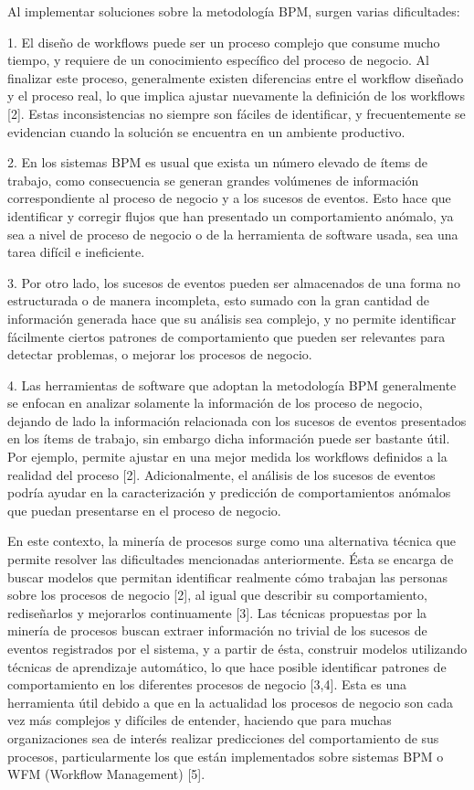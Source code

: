Al implementar soluciones sobre la metodología BPM, surgen varias dificultades:

1. El diseño de workflows puede ser un proceso complejo que consume mucho tiempo, y requiere de un conocimiento específico del proceso de negocio. Al finalizar este proceso, generalmente existen diferencias entre el workflow diseñado y el proceso real, lo que implica ajustar nuevamente la definición de los workflows [2]. Estas inconsistencias no siempre son fáciles de identificar, y frecuentemente se evidencian cuando la solución se encuentra en un ambiente productivo.

2. En los sistemas BPM es usual que exista un número elevado de ítems de trabajo, como consecuencia se generan grandes volúmenes de información correspondiente al proceso de negocio y a los sucesos de eventos. Esto hace que identificar y corregir flujos que han presentado un comportamiento anómalo, ya sea a nivel de proceso de negocio o de la herramienta de software usada, sea una tarea difícil e ineficiente.

3. Por otro lado, los sucesos de eventos pueden ser almacenados de una forma no estructurada o de manera incompleta, esto sumado con la gran cantidad de información generada hace que su análisis sea complejo, y no permite identificar fácilmente ciertos patrones de comportamiento que pueden ser relevantes para detectar problemas, o mejorar los procesos de negocio.

4. Las herramientas de software que adoptan la metodología BPM generalmente se enfocan en analizar solamente la información de los proceso de negocio, dejando de lado la información relacionada con los sucesos de eventos presentados en los ítems de trabajo, sin embargo dicha información puede ser bastante útil. Por ejemplo, permite ajustar en una mejor medida los workflows definidos a la realidad del proceso [2]. Adicionalmente, el análisis de los sucesos de eventos podría ayudar en la caracterización y predicción de comportamientos anómalos que puedan presentarse en el proceso de negocio.

En este contexto, la minería de procesos surge como una alternativa técnica que permite resolver las dificultades mencionadas anteriormente. Ésta se encarga de buscar modelos que permitan identificar realmente cómo trabajan las personas sobre los procesos de negocio [2], al igual que describir su comportamiento, rediseñarlos y mejorarlos continuamente [3]. Las técnicas propuestas por la minería de procesos buscan extraer información no trivial de los sucesos de eventos registrados por el sistema, y a partir de ésta, construir modelos utilizando técnicas de aprendizaje automático, lo que hace posible identificar patrones de comportamiento en los diferentes procesos de negocio [3,4]. Esta es una herramienta útil debido a que en la actualidad los procesos de negocio son cada vez más complejos y difíciles de entender, haciendo que para muchas organizaciones sea de interés realizar predicciones del comportamiento de sus procesos, particularmente los que están implementados sobre sistemas BPM o WFM (Workflow Management) [5].


